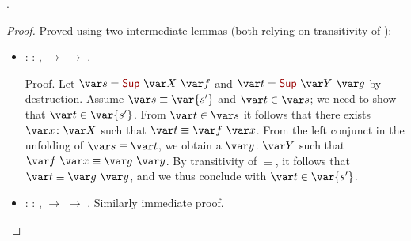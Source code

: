 \begin{coqdoccode}
  \coqdocemptyline
  \coqdocnoindent
{}           .\coqdoceol
\end{coqdoccode}
\begin{proof}
  Proved using two intermediate lemmas (both relying on transitivity of ):
  \begin{itemize}
    \item {}: %
    \coqdockw{\ensuremath{\forall}}    : ,  \EQ {} \ensuremath{\rightarrow}  \IN {} \ensuremath{\rightarrow}  \IN {}.


    Proof. Let $\var s = \coqdocconstructor{Sup}~\var X~\var f$ and $\var t = \coqdocconstructor{Sup}~\var Y~\var g$ by destruction. Assume $\var s \equiv \var{s'}$ and $\var t \in \var s$; we need to show that $\var t \in \var{s'}$. From $\var t \in \var s$ it follows that there exists $\var x\colon \var X$ such that $\var t \equiv \var f~\var x$. From the left conjunct in the unfolding of $\var s \equiv \var t$, we obtain a $\var y\colon \var Y$ such that $\var f~\var x \equiv \var g~\var y$. By transitivity of $\equiv$, it follows that $\var t \equiv \var g~\var y$, and we thus conclude with $\var t \in \var{s'}$.


    \item {}: %
    \coqdockw{\ensuremath{\forall}}    : ,  \EQ {} \ensuremath{\rightarrow}  \IN {} \ensuremath{\rightarrow}  \IN {}. Similarly immediate proof.
    \qedhere
  \end{itemize}
\end{proof}

